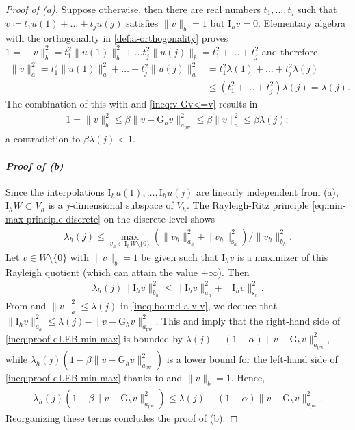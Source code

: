 \documentclass[a4paper]{amsart}
\numberwithin{equation}{section}
\newcommand{\I}{\mathrm{I}}
\newcommand{\s}{\mathrm{s}}
\newcommand{\pw}{\mathrm{pw}}
\theoremstyle{remark}
\theoremstyle{definition}
\theoremstyle{assumptionnoperiod}
\begin{document}
\begin{proof}[Proof of (a)]
	Suppose otherwise, then there are real numbers $t_1, \dots, t_j$ such that $v \coloneqq t_1 u(1) + \dots + t_ju(j)$ satisfies $\|v\|_b = 1$ but $\I_h v = 0$.
	Elementary algebra with the orthogonality in \eqref{def:a-orthogonality} proves
	$1 = \|v\|_b^2 = t_1^2 \|u(1)\|_b^2 + \dots t_j^2 \|u(j)\|_b = t_1^2 + \dots + t_j^2$ and therefore,
	\begin{align}\label{ineq:bound-a-v-v}
		\|v\|_a^2 = t_1^2 \|u(1)\|^2_a + \dots + t_j^2 \|u(j)\|_a^2 &= t_1^2 \lambda(1) + \dots + t_j^2 \lambda(j)\nonumber\\
		&\leq (t_1^2 + \dots + t_j^2)\lambda(j) = \lambda(j).
	\end{align}
	The combination of this with  and \eqref{ineq:v-Gv<=v} results in
	\begin{align}\label{ineq:proof-dLEB-claim-1}
		1 = \|v\|_b^2 \leq \beta \|v - \mathrm{G}_h v\|_{a_\pw}^2 \leq \beta \|v\|^2_a \leq \beta \lambda(j);
	\end{align}
	a contradiction to $\beta\lambda(j) < 1$.\\[-0.5em]
	
	\paragraph{\emph{Proof of (b)}}
	Since the interpolations $\I_h u(1), \dots, \I_h u(j)$ are linearly independent from (a), $\I_h W \subset V_h$ is a $j$-dimensional subspace of $V_h$.
	The Rayleigh-Ritz principle \eqref{eq:min-max-principle-discrete} on the discrete level shows
	\begin{align*}
		\lambda_h(j) \leq \max_{v_h \in \I_h W\setminus\{0\}} (\|v_h\|_{a_h}^2 + \|v_h\|_{\s_h}^2)/\|v_h\|_{b_h}^2.
	\end{align*}
	Let $v \in W \setminus \{0\}$ with $\|v\|_b = 1$ be given such that $\I_h v$ is a maximizer of this Rayleigh quotient (which can attain the value $+\infty$).
	Then
	\begin{align}\label{ineq:proof-dLEB-min-max}
		\lambda_h(j) \|\I_h v\|_{b_h}^2 \leq \|\I_h v\|_{a_h}^2 + \|\I_h v\|_{\s_h}^2.
	\end{align}
	From  and $\|v\|_a^2 \leq \lambda(j)$ in \eqref{ineq:bound-a-v-v}, we deduce that
	$\|\I_h v\|_{a_h}^2 \leq \lambda(j) - \|v - \mathrm{G}_h v\|_{a_\pw}^2$. This and  imply that the right-hand side of \eqref{ineq:proof-dLEB-min-max} is bounded by $\lambda(j) - (1 - \alpha)\|v - \mathrm{G}_h v\|_{a_\pw}^2$, while $\lambda_h(j)(1 - \beta \|v - \mathrm{G}_h v\|_{a_\pw}^2)$ is a lower bound for the left-hand side of \eqref{ineq:proof-dLEB-min-max} thanks to  and $\|v\|_b = 1$. Hence,
	\begin{align*}
		\lambda_h(j)(1 - \beta \|v - \mathrm{G}_h v\|_{a_\pw}^2) \leq \lambda(j) - (1 - \alpha)\|v - \mathrm{G}_h v\|_{a_\pw}^2.
	\end{align*}
	Reorganizing these terms concludes the proof of (b).
\end{proof}
\end{document}
